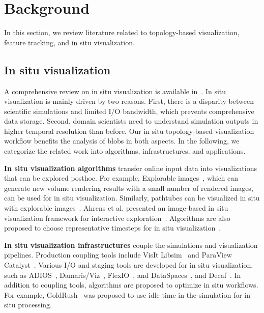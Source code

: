 \section{Background}
\label{sec:related}

In this section, we review literature related to topology-based visualization, feature tracking, and in situ visualization.  


\subsection{In situ visualization}

A comprehensive review on in situ visualization is available in~\cite{BauerAACGKMLVWB16}.  In situ visualization is mainly driven by two reasons.  First, there is a disparity between scientific simulations and limited I/O bandwidth, which prevents comprehensive data storage.  Second, domain scientists need to understand simulation outputs in higher temporal resolution than before.  Our in situ topology-based visualization workflow benefits the analysis of blobs in both aspects.  In the following, we categorize the related work into algorithms, infrastructures, and applications.  

{\bf In situ visualization algorithms} transfer online input data into visualizations that can be explored posthoc.  For example, Explorable images~\cite{TikhonovaCM2010}, which can generate new volume rendering results with a small number of rendered images, can be used for in situ visualization.  Similarly, pathtubes can be visualized in situ with explorable images~\cite{YeMM13}.  Ahrens et al. presented an image-based in situ visualization framework for interactive exploration~\cite{AhrensJOPRP14}.  Algorithms are also proposed to choose representative timesteps for in situ visualization~\cite{MalakarVMKHLP15}.  

{\bf In situ visualization infrastructures} couple the simulations and visualization pipelines.  Production coupling tools include VisIt Libsim~\cite{WhitlockFM11} and ParaView Catalyst~\cite{FabianMTBMGRJ11}.  
Various I/O and staging tools are developed for in situ visualization, such as ADIOS~\cite{LofsteadZKS09}, Damaris/Viz~\cite{DorierSPAS13}, FlexIO~\cite{ZhengZESWDNCAKPY13}, and DataSpaces~\cite{DocanPK12}, and Decaf~\cite{dreher_anlreport17}.  
In addition to coupling tools, algorithms are proposed to optimize in situ workflows.  For example, GoldRush~\cite{ZhengYHWESAK13} was proposed to use idle time in the simulation for in situ processing.  


